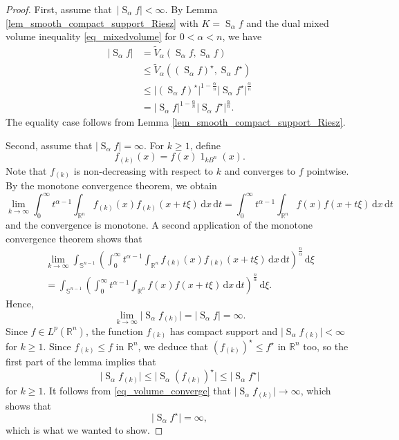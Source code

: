 \documentclass[10pt,a4paper]{amsart}
\newcommand{\B}{{B^n}}
\newcommand{\R}{\mathbb R}
\newcommand{\hls}[1]{\operatorname{S}_{#1}\!} %
\newcommand{\sn}{{\mathbb S}^{n-1}}
\newcommand{\vol}[1]{\vert #1\vert}
\renewcommand{\chi}{\operatorname{1}}
\renewcommand{\d}{\,\mathrm{d}}
\begin{document}
\begin{proof}
First, assume that $\,\vol{\hls \alpha f}<\infty$.  By Lemma \ref{lem_smooth_compact_support_Riesz} with $K=\hls \alpha f$ and the dual mixed volume inequality \eqref{eq_mixedvolume} for $0<\alpha<n$,  we have
\begin{align}
	\vol{\hls\alpha f}
	&= \tilde V_\alpha(\hls \alpha f, \hls\alpha f)\\ 
	&\leq \tilde V_\alpha((\hls\alpha f)^\star, \hls\alpha f^\star)\\
	&\leq \vol{(\hls\alpha f)^\star}^{1-\frac {\alpha}n} \vol{\hls\alpha f^\star}^{\frac \alpha n}\\
	&= \vol{\hls \alpha f}^{1-\frac {\alpha}n} \vol{\hls\alpha f^\star}^{\frac \alpha n}.
\end{align}
The equality case follows from Lemma \ref{lem_smooth_compact_support_Riesz}. 

\goodbreak
Second, assume that $\vol{\hls\alpha f} = \infty$. For $k\ge1$, define 
\[f_{(k)}(x) = f(x) \chi_{k \B}(x).
\]
Note that $f_{(k)}$ is non-decreasing with respect to $k$ and converges to $f$ pointwise. 
By the monotone convergence theorem, we obtain
\begin{equation}
\lim_{k\to\infty}\int_0^\infty t^{\alpha-1} \int_{\R^n} f_{(k)}(x)f_{(k)}(x+t \xi) \d x \d t= \int_0^\infty t^{\alpha-1} \int_{\R^n} f(x)f(x+t \xi) \d x \d t
\end{equation}
and the convergence is monotone. A second application of the monotone convergence theorem shows that
\begin{multline}
\lim_{k\to\infty}\int_{\sn} \left( \int_0^\infty t^{\alpha-1} \int_{\R^n} f_{(k)}(x)f_{(k)}(x+t \xi) \d x \d t \right)^{\frac n\alpha} \d\xi \\= \int_{\sn} \left( \int_0^\infty t^{\alpha-1} \int_{\R^n} f(x)f(x+t \xi) \d x \d t\right)^{\frac n\alpha} \d\xi. 
\end{multline}
Hence,
\begin{equation}\label{eq_volume_converge}
\lim_{k\to\infty}\vol{\hls \alpha f_{(k)}} = \vol{\hls \alpha f} = \infty.
\end{equation}
Since $f\in L^p(\R^n)$, the function $f_{(k)}$ has compact support and $\vol{\hls \alpha f_{(k)}}<\infty$ for $k\ge 1$.
Since $f_{(k)} \leq f$ in $\R^n$, we deduce that $(f_{(k)})^\star \leq f^\star$ in $\R^n$ too, so the first part of the lemma implies that
\begin{equation}
\vol{\hls\alpha f_{(k)}} \leq \vol{\hls\alpha (f_{(k)})^\star} \leq \vol{\hls\alpha f^\star} 
\end{equation}
for $k\ge 1$.
It follows from \eqref{eq_volume_converge} that
 $\vol{\hls \alpha f_{(k)}} \to \infty$, which shows that
		\begin{equation}
		\vol{\hls\alpha f^\star} = \infty,
		\end{equation}
which is what we wanted to show.
\end{proof}
\end{document}
